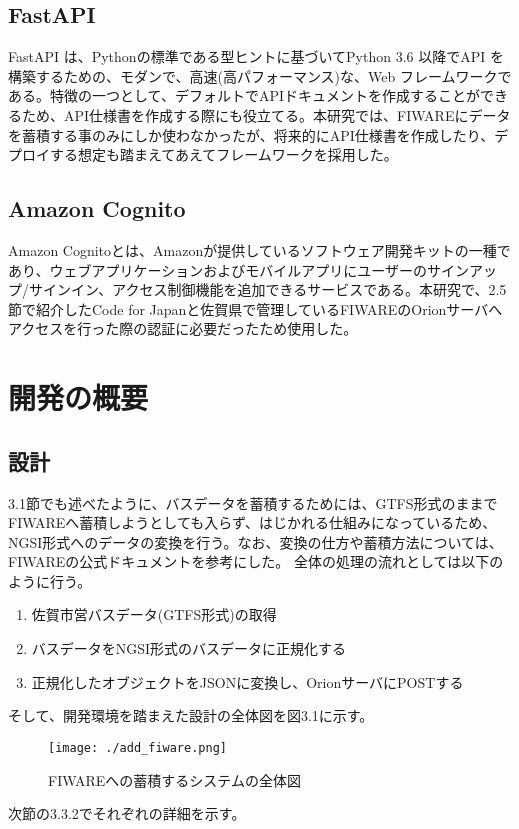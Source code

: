 \documentclass[a4paper, 12pt]{jsreport}
\begin{document}
  \subsection{FastAPI}
  \par FastAPI は、Pythonの標準である型ヒントに基づいてPython 3.6 以降でAPI
  を構築するための、モダンで、高速(高パフォーマンス)な、Web
  フレームワークである。特徴の一つとして、デフォルトでAPIドキュメントを作成することができるため、API仕様書を作成する際にも役立てる。本研究では、FIWAREにデータを蓄積する事のみにしか使わなかったが、将来的にAPI仕様書を作成したり、デプロイする想定も踏まえてあえてフレームワークを採用した。
  \subsection{Amazon Cognito}
  \par Amazon
  Cognitoとは、Amazonが提供しているソフトウェア開発キットの一種であり、ウェブアプリケーションおよびモバイルアプリにユーザーのサインアップ/サインイン、アクセス制御機能を追加できるサービスである。本研究で、2.5節で紹介したCode
  for
  Japanと佐賀県で管理しているFIWAREのOrionサーバへアクセスを行った際の認証に必要だったため使用した。

  \section{開発の概要}
  \subsection{設計}
  \par 3.1節でも述べたように、バスデータを蓄積するためには、GTFS形式のままでFIWAREへ蓄積しようとしても入らず、はじかれる仕組みになっているため、NGSI形式へのデータの変換を行う。なお、変換の仕方や蓄積方法については、FIWAREの公式ドキュメント\cite{fiwareDoc}を参考にした。
  全体の処理の流れとしては以下のように行う。
  \begin{enumerate}
    \item 佐賀市営バスデータ(GTFS形式)の取得

    \item バスデータをNGSI形式のバスデータに正規化する

    \item 正規化したオブジェクトをJSONに変換し、OrionサーバにPOSTする
  \end{enumerate}
  \par そして、開発環境を踏まえた設計の全体図を図3.1に示す。
  \begin{figure}[H]
    \begin{center}
      \texttt{[image: ./add\_fiware.png]}
      \caption{FIWAREへの蓄積するシステムの全体図}
    \end{center}
  \end{figure}
  \par 次節の3.3.2でそれぞれの詳細を示す。
\end{document}
